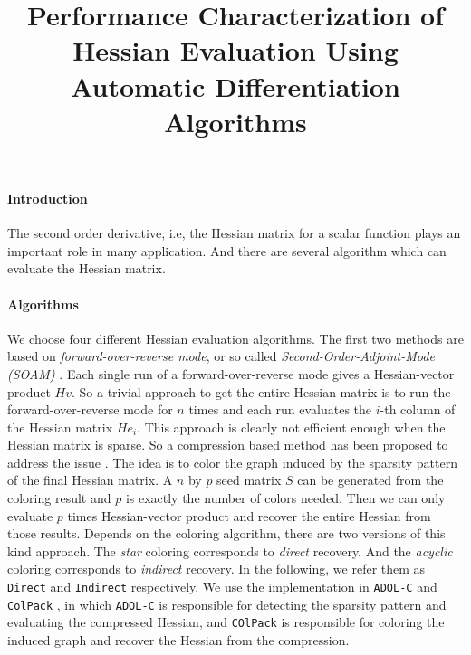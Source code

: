 \documentclass[12pt]{article}
\begin{document}
\title{Performance Characterization of Hessian Evaluation Using Automatic Differentiation Algorithms}
\maketitle
\paragraph{Introduction}
The second order derivative, i.e, the Hessian matrix for a scalar function plays an important role in many application. And there are several algorithm which can evaluate the Hessian matrix.
\paragraph{Algorithms}
We choose four different Hessian evaluation algorithms. The first two methods are based on {\em forward-over-reverse mode}, or so called {\em Second-Order-Adjoint-Mode (SOAM)} \cite{griewank2008evaluating, naumann2012art}. Each single run of a forward-over-reverse mode gives a Hessian-vector product $Hv$. So a trivial approach to get the entire Hessian matrix is to run the forward-over-reverse mode for $n$ times and each run evaluates the $i$-th column of the Hessian matrix $He_i$. This approach is clearly not efficient enough when the Hessian matrix is sparse.  So a compression based method has been proposed to address the issue \cite{gebremedhin2009efficient}. The idea is to color the graph induced by the sparsity pattern of the final Hessian matrix. A $n$ by $p$ seed matrix $S$ can be generated from the coloring result and $p$ is exactly the number of colors needed. Then we can only evaluate $p$ times Hessian-vector product and recover the entire Hessian from those results. Depends on the coloring algorithm, there are two versions of this kind approach. The {\em star} coloring corresponds to {\em direct} recovery. And the {\em acyclic} coloring corresponds to {\em indirect} recovery. In the following, we refer them as {\tt Direct} and {\tt Indirect} respectively. We use the implementation in {\tt ADOL-C} \cite{walther2009getting} and {\tt ColPack} \cite{gebremedhin2013colpack}, in which {\tt ADOL-C} is responsible for detecting the sparsity pattern and evaluating the compressed Hessian, and {\tt COlPack} is responsible for coloring the induced graph and recover the Hessian from the compression.
\end{document}
